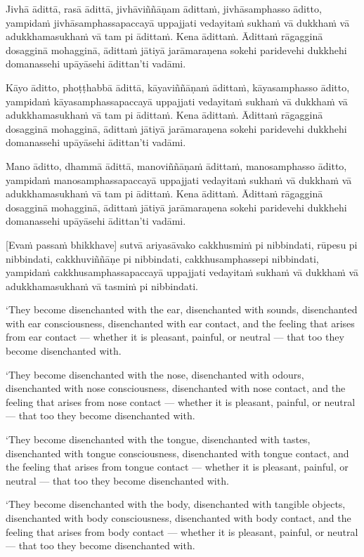 Jivhā ādittā, rasā ādittā, jivhāviññāṇam ādittaṁ, jivhāsamphasso āditto,
yampidaṁ jivhāsamphassapaccayā uppajjati vedayitaṁ sukhaṁ vā dukkhaṁ vā
adukkhamasukhaṁ vā tam pi ādittaṁ. Kena ādittaṁ. Ādittaṁ rāgagginā
dosagginā mohagginā, ādittaṁ jātiyā jarāmaraṇena sokehi paridevehi
dukkhehi domanassehi upāyāsehi ādittan'ti vadāmi.

Kāyo āditto, phoṭṭhabbā ādittā, kāyaviññāṇaṁ ādittaṁ, kāyasamphasso
āditto, yampidaṁ kāyasamphassapaccayā uppajjati vedayitaṁ sukhaṁ vā
dukkhaṁ vā adukkhamasukhaṁ vā tam pi ādittaṁ. Kena ādittaṁ. Ādittaṁ
rāgagginā dosagginā mohagginā, ādittaṁ jātiyā jarāmaraṇena sokehi
paridevehi dukkhehi domanassehi upāyāsehi ādittan'ti vadāmi.

Mano āditto, dhammā ādittā, manoviññāṇaṁ ādittaṁ, manosamphasso āditto,
yampidaṁ manosamphassapaccayā uppajjati vedayitaṁ sukhaṁ vā dukkhaṁ vā
adukkhamasukhaṁ vā tam pi ādittaṁ. Kena ādittaṁ. Ādittaṁ rāgagginā
dosagginā mohagginā, ādittaṁ jātiyā jarāmaraṇena sokehi paridevehi
dukkhehi domanassehi upāyāsehi ādittan'ti vadāmi.

\enlargethispage{2\baselineskip}

[Evaṁ passaṁ bhikkhave] sutvā ariyasāvako cakkhusmiṁ pi nibbindati,
rūpesu pi nibbindati, cakkhuviññāṇe pi nibbindati, cakkhusamphassepi
nibbindati, yampidaṁ cakkhusamphassapaccayā uppajjati vedayitaṁ sukhaṁ
vā dukkhaṁ vā adukkhamasukhaṁ vā tasmiṁ pi nibbindati.

\clearpage

\englishText
\markboth{\englishTitle}{\rightmark}

‘They become disenchanted with the ear, disenchanted with sounds,
disenchanted with ear consciousness, disenchanted with ear contact, and
the feeling that arises from ear contact --- whether it is pleasant,
painful, or neutral --- that too they become disenchanted with.

‘They become disenchanted with the nose, disenchanted with odours,
disenchanted with nose consciousness, disenchanted with nose contact,
and the feeling that arises from nose contact --- whether it is pleasant,
painful, or neutral --- that too they become disenchanted with.

‘They become disenchanted with the tongue, disenchanted with tastes,
disenchanted with tongue consciousness, disenchanted with tongue
contact, and the feeling that arises from tongue contact --- whether it is
pleasant, painful, or neutral --- that too they become disenchanted with.

‘They become disenchanted with the body, disenchanted with tangible
objects, disenchanted with body consciousness, disenchanted with body
contact, and the feeling that arises from body contact --- whether it is
pleasant, painful, or neutral --- that too they become disenchanted with.

